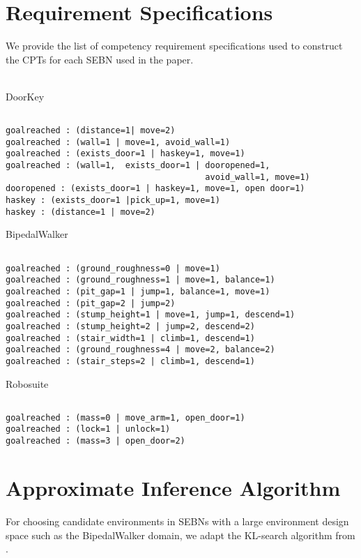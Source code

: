 \newpage
\appendix
\section{Requirement Specifications}
We provide the list of competency requirement specifications used to construct the CPTs for each SEBN used in the paper. 
\\
\\
\begin{small}

\noindent
DoorKey
\begin{verbatim}

goalreached : (distance=1| move=2) 
goalreached : (wall=1 | move=1, avoid_wall=1)
goalreached : (exists_door=1 | haskey=1, move=1)
goalreached : (wall=1,  exists_door=1 | dooropened=1, 
                                        avoid_wall=1, move=1)
dooropened : (exists_door=1 | haskey=1, move=1, open door=1)
haskey : (exists_door=1 |pick_up=1, move=1)
haskey : (distance=1 | move=2)

\end{verbatim}
\noindent
BipedalWalker

\begin{verbatim}

goalreached : (ground_roughness=0 | move=1)
goalreached : (ground_roughness=1 | move=1, balance=1)
goalreached : (pit_gap=1 | jump=1, balance=1, move=1)
goalreached : (pit_gap=2 | jump=2)
goalreached : (stump_height=1 | move=1, jump=1, descend=1)
goalreached : (stump_height=2 | jump=2, descend=2)
goalreached : (stair_width=1 | climb=1, descend=1)
goalreached : (ground_roughness=4 | move=2, balance=2)
goalreached : (stair_steps=2 | climb=1, descend=1)

\end{verbatim}

\noindent
Robosuite
\begin{verbatim}

goalreached : (mass=0 | move_arm=1, open_door=1)
goalreached : (lock=1 | unlock=1)
goalreached : (mass=3 | open_door=2)

\end{verbatim}
\end{small}

\newpage

\section{Approximate Inference Algorithm}
For choosing candidate environments in SEBNs with a large environment design space such as the BipedalWalker domain, we adapt the KL-search algorithm from \cite{hsiao2024surrogate}. 


